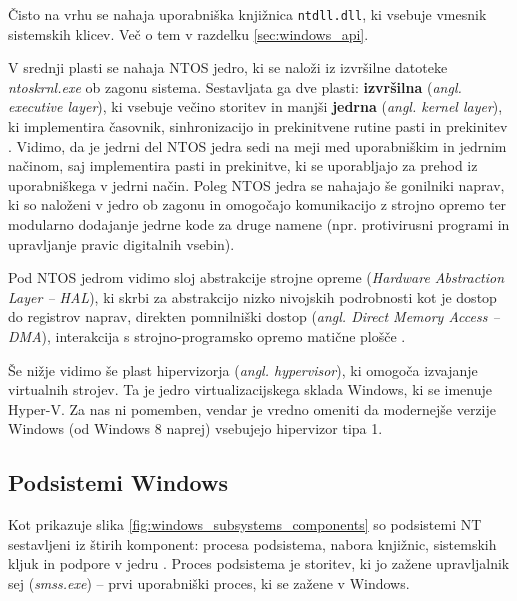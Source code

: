 \documentclass[a4paper,12pt,openright]{book}
\begin{document}
Čisto na vrhu se nahaja uporabniška knjižnica \texttt{ntdll.dll}, ki vsebuje vmesnik sistemskih klicev.
Več o tem v razdelku \ref{sec:windows_api}.

V srednji plasti se nahaja NTOS jedro, ki se naloži iz izvršilne datoteke \textit{ntoskrnl.exe} ob zagonu sistema.
Sestavljata ga dve plasti: \textbf{izvršilna} (\textit{angl. executive layer}), ki vsebuje večino storitev in manjši \textbf{jedrna} (\textit{angl. kernel layer}), ki implementira časovnik, sinhronizacijo in prekinitvene rutine pasti in prekinitev \cite{Tanenbaum_Bos_2023}.
Vidimo, da je jedrni del NTOS jedra sedi na meji med uporabniškim in jedrnim načinom, saj implementira pasti in prekinitve, ki se uporabljajo za prehod iz uporabniškega v jedrni način.
Poleg NTOS jedra se nahajajo še gonilniki naprav, ki so naloženi v jedro ob zagonu in omogočajo komunikacijo z strojno opremo ter modularno dodajanje jedrne kode za druge namene (npr. protivirusni programi in upravljanje pravic digitalnih vsebin).

Pod NTOS jedrom vidimo sloj abstrakcije strojne opreme (\textit{Hardware Abstraction Layer -- HAL}), ki skrbi za abstrakcijo nizko nivojskih podrobnosti kot je dostop do registrov naprav, direkten pomnilniški dostop (\textit{angl. Direct Memory Access -- DMA}), interakcija s strojno-programsko opremo matične plošče \cite{Tanenbaum_Bos_2023}.

Še nižje vidimo še plast hipervizorja (\textit{angl. hypervisor}), ki omogoča izvajanje virtualnih strojev.
Ta je jedro virtualizacijskega sklada Windows, ki se imenuje Hyper-V.
Za nas ni pomemben, vendar je vredno omeniti da modernejše verzije Windows (od Windows 8 naprej) vsebujejo hipervizor tipa 1.

\subsection{Podsistemi Windows} \label{ssec:windows:subsystems}

Kot prikazuje slika \ref{fig:windows_subsystems_components} so podsistemi NT sestavljeni iz štirih komponent: procesa podsistema, nabora knjižnic, sistemskih kljuk in podpore v jedru \cite{Tanenbaum_Bos_2023}.
Proces podsistema je storitev, ki jo zažene upravljalnik sej (\textit{smss.exe}) -- prvi uporabniški proces, ki se zažene v Windows.
\end{document}

